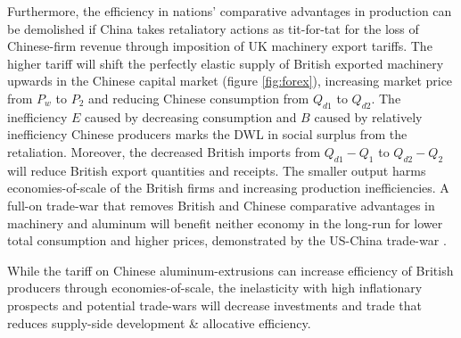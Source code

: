 \documentclass[a4paper,12pt]{article}
\begin{document}
Furthermore, the efficiency in nations' comparative advantages in production can be demolished if China takes retaliatory actions as tit-for-tat for the loss of Chinese-firm revenue through imposition of UK machinery export tariffs. The higher tariff will shift the perfectly elastic supply of British exported machinery upwards in the Chinese capital market (figure \ref{fig:forex}), increasing market price from $P_w$ to $P_2$ and reducing Chinese consumption from $Q_{d1}$ to $Q_{d2}$. The inefficiency $E$ caused by decreasing consumption and $B$ caused by relatively inefficiency Chinese producers marks the DWL in social surplus from the retaliation. Moreover, the decreased British imports from $Q_{d1}-Q_1$ to $Q_{d2}-Q_2$ will reduce British export quantities and receipts. The smaller output harms economies-of-scale of the British firms and increasing production inefficiencies. A full-on trade-war that removes British and Chinese comparative advantages in machinery and aluminum will benefit neither economy in the long-run for lower total consumption and higher prices, demonstrated by the US-China trade-war \parencite{hass_denmark_2022}.




While the tariff on Chinese aluminum-extrusions can increase efficiency of British producers through economies-of-scale, the inelasticity with high inflationary prospects and potential trade-wars will decrease investments and trade that reduces supply-side development \& allocative efficiency.



\newpage
\printbibliography
\end{document}

